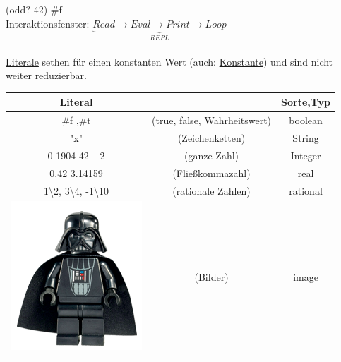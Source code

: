 (odd? 42) \eval \#f
\bigskip\\
Interaktionsfenster:\hspace*{2.5cm} $\underbrace{Read \rightarrow Eval \rightarrow Print \rightarrow Loop}_{REPL}$\\
\bigskip\\
\underline{Literale} sethen f\"ur einen konstanten Wert (auch: \underline{Konstante}) und sind nicht weiter reduzierbar.\\
\begin{center}
\begin{tabular}{ccc}
Literal &  & Sorte,Typ\\
\hline
\#f ,\#t & (true, false, Wahrheitswert) & boolean\\
"x" & (Zeichenketten) & String\\
0 1904 42 $-2$ & (ganze Zahl) & Integer\\
0.42 3.14159 & (Flie\ss kommazahl) & real\\
1\textbackslash 2, 3\textbackslash 4, -1\textbackslash 10 & (rationale Zahlen) & rational\\
\includegraphics[scale=0.2]{Darth_Vader} & (Bilder) & image

\end{tabular}
\end{center}


